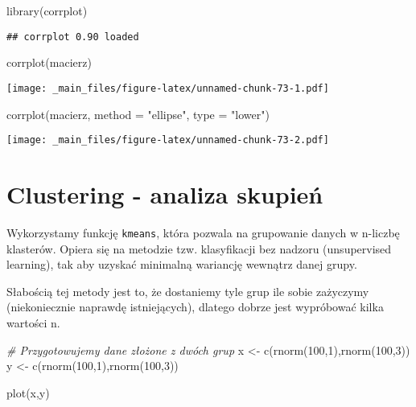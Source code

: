 \documentclass[
]{book}
\newenvironment{Shaded}{\begin{snugshade}}{\end{snugshade}}
\newcommand{\AttributeTok}[1]{\textcolor[rgb]{0.77,0.63,0.00}{#1}}
\newcommand{\CommentTok}[1]{\textcolor[rgb]{0.56,0.35,0.01}{\textit{#1}}}
\newcommand{\DecValTok}[1]{\textcolor[rgb]{0.00,0.00,0.81}{#1}}
\newcommand{\FunctionTok}[1]{\textcolor[rgb]{0.00,0.00,0.00}{#1}}
\newcommand{\NormalTok}[1]{#1}
\newcommand{\OtherTok}[1]{\textcolor[rgb]{0.56,0.35,0.01}{#1}}
\newcommand{\StringTok}[1]{\textcolor[rgb]{0.31,0.60,0.02}{#1}}
\begin{document}
\begin{Shaded}
\begin{Highlighting}[]
\FunctionTok{library}\NormalTok{(corrplot)}
\end{Highlighting}
\end{Shaded}

\begin{verbatim}
## corrplot 0.90 loaded
\end{verbatim}

\begin{Shaded}
\begin{Highlighting}[]
\FunctionTok{corrplot}\NormalTok{(macierz)}
\end{Highlighting}
\end{Shaded}

\texttt{[image: \_main\_files/figure-latex/unnamed-chunk-73-1.pdf]}

\begin{Shaded}
\begin{Highlighting}[]
\FunctionTok{corrplot}\NormalTok{(macierz, }\AttributeTok{method =} \StringTok{"ellipse"}\NormalTok{, }\AttributeTok{type =} \StringTok{"lower"}\NormalTok{)}
\end{Highlighting}
\end{Shaded}

\texttt{[image: \_main\_files/figure-latex/unnamed-chunk-73-2.pdf]}

\hypertarget{clustering---analiza-skupieux144}{%
\section{Clustering - analiza skupień}\label{clustering---analiza-skupieux144}}

Wykorzystamy funkcję \texttt{kmeans}, która pozwala na grupowanie danych w n-liczbę klasterów. Opiera się na metodzie tzw. klasyfikacji bez nadzoru (unsupervised learning), tak aby uzyskać minimalną wariancję wewnątrz danej grupy.

Słabością tej metody jest to, że dostaniemy tyle grup ile sobie zażyczymy (niekoniecznie naprawdę istniejących), dlatego dobrze jest wypróbować kilka wartości n.

\begin{Shaded}
\begin{Highlighting}[]
\CommentTok{\# Przygotowujemy dane złożone z dwóch grup}
\NormalTok{x }\OtherTok{\textless{}{-}} \FunctionTok{c}\NormalTok{(}\FunctionTok{rnorm}\NormalTok{(}\DecValTok{100}\NormalTok{,}\DecValTok{1}\NormalTok{),}\FunctionTok{rnorm}\NormalTok{(}\DecValTok{100}\NormalTok{,}\DecValTok{3}\NormalTok{))}
\NormalTok{y }\OtherTok{\textless{}{-}} \FunctionTok{c}\NormalTok{(}\FunctionTok{rnorm}\NormalTok{(}\DecValTok{100}\NormalTok{,}\DecValTok{1}\NormalTok{),}\FunctionTok{rnorm}\NormalTok{(}\DecValTok{100}\NormalTok{,}\DecValTok{3}\NormalTok{))}

\FunctionTok{plot}\NormalTok{(x,y)}
\end{Highlighting}
\end{Shaded}
\end{document}
